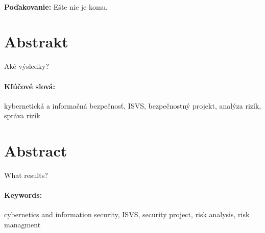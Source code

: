 \documentclass[12pt, twoside]{book}
\begin{document}
\newpage 
\pagestyle{plain}
~

\vfill
{\bf Poďakovanie:} Ešte nie je komu.


\newpage 
\section*{Abstrakt}

Aké výsledky?

\paragraph*{Kľúčové slová:} 
kybernetická a informačná bezpečnosť,
ISVS,
bezpečnostný projekt,
analýza rizík,
správa rizík


\newpage 
\section*{Abstract}

What results?

\paragraph*{Keywords:} 
cybernetics and information security,
ISVS,
security project,
risk analysis,
risk managment




\cleardoublepage
\tableofcontents



\newpage 

\listoffigures
\listoftables


\mainmatter
\pagestyle{headings}









\end{document}
